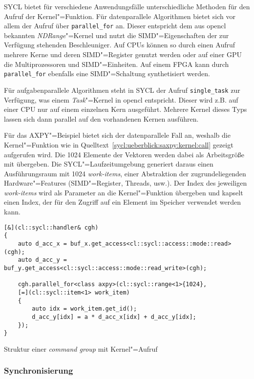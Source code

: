 SYCL bietet für verschiedene Anwendungsfälle unterschiedliche Methoden für den
Aufruf der Kernel"=Funktion. Für datenparallele Algorithmen bietet sich vor
allem der Aufruf über \texttt{parallel\_for} an. Dieser entspricht dem aus
\gls{opencl} bekannten \textit{NDRange}"=Kernel und nutzt die
SIMD"=Eigenschaften der zur Verfügung stehenden Beschleuniger. Auf CPUs können
so durch einen Aufruf mehrere Kerne und deren SIMD"=Register genutzt werden oder
auf einer GPU die Multiprozessoren und SIMD"=Einheiten. Auf einem FPGA kann
durch \texttt{parallel\_for} ebenfalls eine SIMD"=Schaltung synthetisiert
werden. 

Für aufgabenparallele Algorithmen steht in SYCL der Aufruf \texttt{single\_task}
zur Verfügung, was einem \textit{Task}"=Kernel in \gls{opencl} entspricht.
Dieser wird z.B. auf einer CPU nur auf einem einzelnen Kern ausgeführt. Mehrere
Kernel dieses Typs lassen sich dann parallel auf den vorhandenen Kernen
ausführen.

Für das AXPY"=Beispiel bietet sich der datenparallele Fall an, weshalb die
Kernel"=Funktion wie in Quelltext~\ref{sycl:ueberblick:saxpy:kernel:call}
gezeigt aufgerufen wird. Die \num{1024} Elemente der Vektoren werden dabei als
Arbeitsgröße mit übergeben. Die SYCL"=Laufzeitumgebung generiert daraus einen
Ausführungsraum mit \num{1024} \textit{work-items}, einer Abstraktion der
zugrundeliegenden Hardware"=Features (SIMD"=Register, Threads, usw.). Der Index
des jeweiligen \textit{work-items} wird als Parameter an die Kernel"=Funktion
übergeben und kapselt einen Index, der für den Zugriff auf ein Element im
Speicher verwendet werden kann. 

\begin{code}
    \begin{verbatim}
[&](cl::sycl::handler& cgh)
{
    auto d_acc_x = buf_x.get_access<cl::sycl::access::mode::read>(cgh);
    auto d_acc_y = buf_y.get_access<cl::sycl::access::mode::read_write>(cgh);

    cgh.parallel_for<class axpy>(cl::sycl::range<1>{1024},
    [=](cl::sycl::item<1> work_item)
    {
        auto idx = work_item.get_id();
        d_acc_y[idx] = a * d_acc_x[idx] + d_acc_y[idx];
    });
}
    \end{verbatim}
    \caption{Struktur einer \textit{command group} mit Kernel"=Aufruf}
    \label{sycl:ueberblick:saxpy:kernel:call}
\end{code}

\subsubsection{Synchronisierung}
\label{sycl:ueberblick:saxpy:sync}

